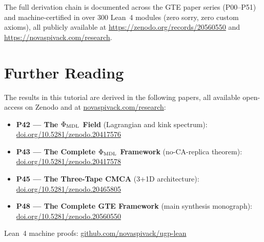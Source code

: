\documentclass[11pt,a4paper]{article}
\theoremstyle{definition}
\begin{document}
\bigskip
\noindent
The full derivation chain is documented across the GTE paper series (P00--P51)
and machine-certified in over 300 Lean~4 modules (zero sorry, zero custom axioms),
all publicly available at \url{https://zenodo.org/records/20560550} and
\url{https://novaspivack.com/research}.



\section*{Further Reading}
\begin{tcolorbox}[colback=orange!8,colframe=orange!50!black,
  title=\textbf{Primary Sources}]
The results in this tutorial are derived in the following papers,
all available open-access on Zenodo and at
\href{https://novaspivack.com/research}{novaspivack.com/research}:
\begin{itemize}
  \item \textbf{P42 --- The $\Phi_{\rm MDL}$ Field} (Lagrangian and kink spectrum):\\
        \href{https://doi.org/10.5281/zenodo.20417576}{doi.org/10.5281/zenodo.20417576}
  \item \textbf{P43 --- The Complete $\Phi_{\rm MDL}$ Framework} (no-CA-replica theorem):\\
        \href{https://doi.org/10.5281/zenodo.20417578}{doi.org/10.5281/zenodo.20417578}
  \item \textbf{P45 --- The Three-Tape CMCA} (3+1D architecture):\\
        \href{https://doi.org/10.5281/zenodo.20465805}{doi.org/10.5281/zenodo.20465805}
  \item \textbf{P48 --- The Complete GTE Framework} (main synthesis monograph):\\
        \href{https://doi.org/10.5281/zenodo.20560550}{doi.org/10.5281/zenodo.20560550}
\end{itemize}
Lean~4 machine proofs: \href{https://github.com/novaspivack/ugp-lean}{github.com/novaspivack/ugp-lean}
\end{tcolorbox}


\end{document}
